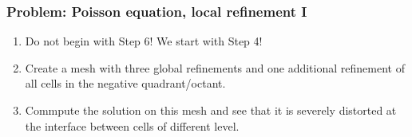 
\begin{frame}
  \frametitle{Problem: Poisson equation, local refinement I}
  \begin{enumerate}
  \item Do not begin with Step 6! We start with Step 4!
  \item Create a mesh with three global refinements and one additional
    refinement of all cells in the negative quadrant/octant.
  \item Commpute the solution on this mesh and see that it is severely
    distorted at the interface between cells of different level.
  \end{enumerate}
\end{frame}

